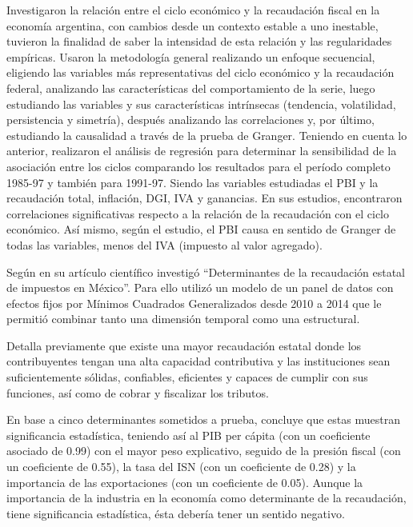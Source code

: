 \documentclass[
  letterpaper,
]{article}
\begin{document}
\textcite{carrera_ciclo_1999} Investigaron la relación entre el ciclo
económico y la recaudación fiscal en la economía argentina, con cambios
desde un contexto estable a uno inestable, tuvieron la finalidad de
saber la intensidad de esta relación y las regularidades empíricas.
Usaron la metodología general realizando un enfoque secuencial,
eligiendo las variables más representativas del ciclo económico y la
recaudación federal, analizando las características del comportamiento
de la serie, luego estudiando las variables y sus características
intrínsecas (tendencia, volatilidad, persistencia y simetría), después
analizando las correlaciones y, por último, estudiando la causalidad a
través de la prueba de Granger. Teniendo en cuenta lo anterior,
realizaron el análisis de regresión para determinar la sensibilidad de
la asociación entre los ciclos comparando los resultados para el período
completo 1985-97 y también para 1991-97. Siendo las variables estudiadas
el PBI y la recaudación total, inflación, DGI, IVA y ganancias. En sus
estudios, encontraron correlaciones significativas respecto a la
relación de la recaudación con el ciclo económico. Así mismo, según el
estudio, el PBI causa en sentido de Granger de todas las variables,
menos del IVA (impuesto al valor agregado).

Según \textcite{tello_determinantes_2018} en su artículo científico
investigó ``Determinantes de la recaudación estatal de impuestos en
México''. Para ello utilizó un modelo de un panel de datos con efectos
fijos por Mínimos Cuadrados Generalizados desde 2010 a 2014 que le
permitió combinar tanto una dimensión temporal como una estructural.

Detalla previamente que existe una mayor recaudación estatal donde los
contribuyentes tengan una alta capacidad contributiva y las
instituciones sean suficientemente sólidas, confiables, eficientes y
capaces de cumplir con sus funciones, así como de cobrar y fiscalizar
los tributos.

En base a cinco determinantes sometidos a prueba, concluye que estas
muestran significancia estadística, teniendo así al PIB per cápita (con
un coeficiente asociado de 0.99) con el mayor peso explicativo, seguido
de la presión fiscal (con un coeficiente de 0.55), la tasa del ISN (con
un coeficiente de 0.28) y la importancia de las exportaciones (con un
coeficiente de 0.05). Aunque la importancia de la industria en la
economía como determinante de la recaudación, tiene significancia
estadística, ésta debería tener un sentido negativo.
\end{document}
